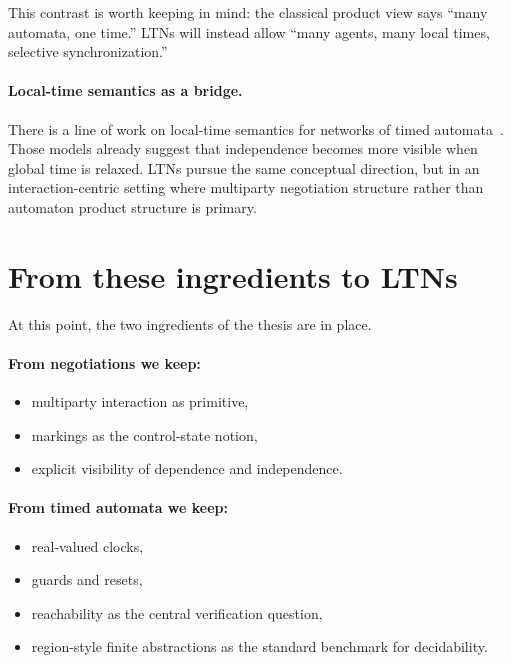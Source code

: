 This contrast is worth keeping in mind: the classical product view says ``many automata, one time.'' LTNs will instead allow ``many agents, many local times, selective synchronization.''

\paragraph{Local-time semantics as a bridge.}
There is a line of work on local-time semantics for networks of timed automata~\cite{LocalTimeTA,LocalZone1,LocalZone2,LocalBuchi}. Those models already suggest that independence becomes more visible when global time is relaxed. LTNs pursue the same conceptual direction, but in an interaction-centric setting where multiparty negotiation structure rather than automaton product structure is primary.


\section{From these ingredients to LTNs}
\label{sec:prelim-synthesis}

At this point, the two ingredients of the thesis are in place.

\paragraph{From negotiations we keep:}
\begin{itemize}
    \item multiparty interaction as primitive,
    \item markings as the control-state notion,
    \item explicit visibility of dependence and independence.
\end{itemize}

\paragraph{From timed automata we keep:}
\begin{itemize}
    \item real-valued clocks,
    \item guards and resets,
    \item reachability as the central verification question,
    \item region-style finite abstractions as the standard benchmark for decidability.
\end{itemize}

